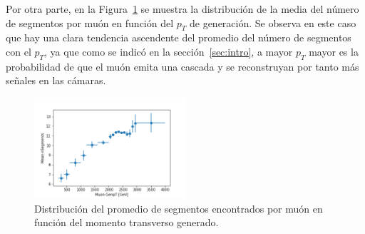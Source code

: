 Por otra parte, en la Figura~\ref{fig:data_nSegmentsMean} se muestra la distribuci\'on de la media del n\'umero de segmentos por mu\'on en funci\'on del $p_{T}$ de generaci\'on. Se observa en este caso que hay una clara tendencia ascendente del promedio del n\'umero de segmentos con el $p_{T}$, ya que como se indic\'o en la secci\'on~\ref{sec:intro}, a mayor $p_{T}$ mayor es la probabilidad de que el mu\'on emita una cascada y se reconstruyan por tanto m\'as se\~nales en las c\'amaras.


\begin{figure}[h]
\centering
\includegraphics[width=0.5\textwidth]{figures/data_simple_genpt_MeanNSegments.png}
\caption{Distribuci\'on del promedio de segmentos encontrados por mu\'on en funci\'on del momento transverso generado.}
\label{fig:data_nSegmentsMean}        
\end{figure}
